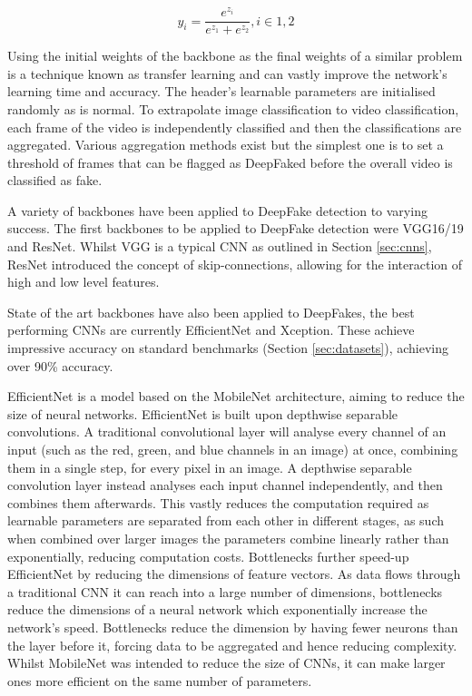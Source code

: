 \begin{equation}
    \label{eq:softmax}
    y_i=\frac{e^{z_i}}{e^{z_1} + e^{z_2}}, i\in1,2
\end{equation}

Using the initial weights of the backbone as the final weights of a similar problem is a technique known as transfer learning\cite{bozinovski1976influence} and can vastly improve the network's learning time and accuracy. The header's learnable parameters are initialised randomly as is normal. To extrapolate image classification to video classification, each frame of the video is independently classified and then the classifications are aggregated. Various aggregation methods exist but the simplest one is to set a threshold of frames that can be flagged as DeepFaked before the overall video is classified as fake.

A variety of backbones have been applied to DeepFake detection to varying success\cite{thing2023deepfake}. The first backbones to be applied to DeepFake detection were VGG16/19\cite{simonyan2014very} and ResNet\cite{he2016deep}. Whilst VGG is a typical CNN as outlined in Section \ref{sec:cnns}, ResNet introduced the concept of skip-connections, allowing for the interaction of high and low level features. 

State of the art backbones have also been applied to DeepFakes, the best performing CNNs are currently EfficientNet\cite{tan2019efficientnet} and Xception\cite{chollet2017xception}. These achieve impressive accuracy on standard benchmarks (Section \ref{sec:datasets}), achieving over 90\% accuracy\cite{bonettini2021video}.

EfficientNet is a model based on the MobileNet\cite{howard2017mobilenets} architecture, aiming to reduce the size of neural networks. EfficientNet is built upon depthwise separable convolutions. A traditional convolutional layer will analyse every channel of an input (such as the red, green, and blue channels in an image) at once, combining them in a single step, for every pixel in an image. A depthwise separable convolution layer instead analyses each input channel independently, and then combines them afterwards. This vastly reduces the computation required as learnable parameters are separated from each other in different stages, as such when combined over larger images the parameters combine linearly rather than exponentially, reducing computation costs. Bottlenecks further speed-up EfficientNet by reducing the dimensions of feature vectors. As data flows through a traditional CNN it can reach into a large number of dimensions, bottlenecks reduce the dimensions of a neural network which exponentially increase the network's speed. Bottlenecks reduce the dimension by having fewer neurons than the layer before it, forcing data to be aggregated and hence reducing complexity. Whilst MobileNet was intended to reduce the size of CNNs, it can make larger ones more efficient on the same number of parameters.

